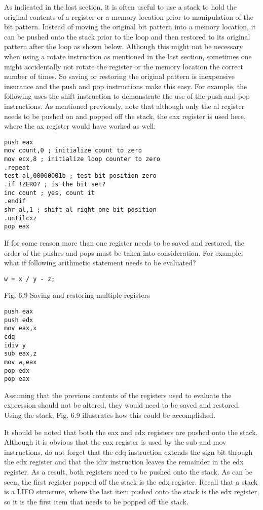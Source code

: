 \documentclass[10pt]{article}
\begin{document}
As indicated in the last section, it is often useful to use a stack to hold the original contents of a register or a memory location prior to manipulation of the bit pattern. Instead of moving the original bit pattern into a memory location, it can be pushed onto the stack prior to the loop and then restored to its original pattern after the loop as shown below. Although this might not be necessary when using a rotate instruction as mentioned in the last section, sometimes one might accidentally not rotate the register or the memory location the correct number of times. So saving or restoring the original pattern is inexpensive insurance and the push and pop instructions make this easy. For example, the following uses the shift instruction to demonstrate the use of the push and pop instructions. As mentioned previously, note that although only the al register needs to be pushed on and popped off the stack, the eax register is used here, where the ax register would have worked as well:

\begin{verbatim}
push eax
mov count,0 ; initialize count to zero
mov ecx,8 ; initialize loop counter to zero
.repeat
test al,00000001b ; test bit position zero
.if !ZERO? ; is the bit set?
inc count ; yes, count it
.endif
shr al,1 ; shift al right one bit position
.untilcxz
pop eax
\end{verbatim}

If for some reason more than one register needs to be saved and restored, the order of the pushes and pops must be taken into consideration. For example, what if following arithmetic statement needs to be evaluated?

\begin{verbatim}
w = x / y - z;
\end{verbatim}

Fig. 6.9 Saving and restoring multiple registers

\begin{verbatim}
push eax
push edx
mov eax,x
cdq
idiv y
sub eax,z
mov w,eax
pop edx
pop eax
\end{verbatim}

Assuming that the previous contents of the registers used to evaluate the expression should not be altered, they would need to be saved and restored. Using the stack, Fig. 6.9 illustrates how this could be accomplished.

It should be noted that both the eax and edx registers are pushed onto the stack. Although it is obvious that the eax register is used by the sub and mov instructions, do not forget that the cdq instruction extends the sign bit through the edx register and that the idiv instruction leaves the remainder in the edx register. As a result, both registers need to be pushed onto the stack. As can be seen, the first register popped off the stack is the edx register. Recall that a stack is a LIFO structure, where the last item pushed onto the stack is the edx register, so it is the first item that needs to be popped off the stack.
\end{document}
